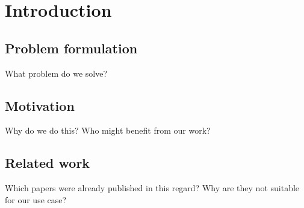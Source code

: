 \section{Introduction}

\subsection{Problem formulation}
What problem do we solve?


\subsection{Motivation}
Why do we do this?
Who might benefit from our work?


\subsection{Related work}
Which papers were already published in this regard?
Why are they not suitable for our use case?

